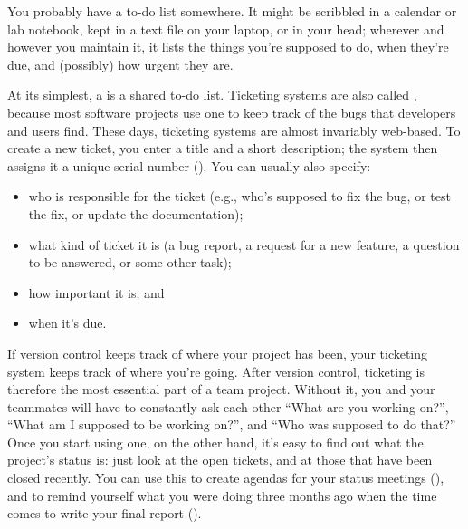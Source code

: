 \documentclass{report}
\begin{document}
You probably have a to-do list somewhere.  It might be scribbled in a
calendar or lab notebook, kept in a text file on your laptop, or in
your head; wherever and however you maintain it, it lists the things
you're supposed to do, when they're due, and (possibly) how urgent
they are.

At its simplest, a  is a shared to-do list.
Ticketing systems are also called , because most
software projects use one to keep track of the bugs that developers
and users find.  These days, ticketing systems are almost invariably
web-based.  To create a new ticket, you enter a title and a short
description; the system then assigns it a unique serial number
().  You can usually also specify:

\begin{itemize}

  \item who is responsible for the ticket (e.g., who's supposed to fix
  the bug, or test the fix, or update the documentation);

  \item what kind of ticket it is (a bug report, a request for a new
  feature, a question to be answered, or some other task);

  \item how important it is; and

  \item when it's due.

\end{itemize}

\begin{figure}
\end{figure}

If version control keeps track of where your project has been, your
ticketing system keeps track of where you're going.  After version
control, ticketing is therefore the most essential part of a team
project.  Without it, you and your teammates will have to constantly
ask each other ``What are you working on?'', ``What am I supposed to
be working on?'', and ``Who was supposed to do that?''  Once you start
using one, on the other hand, it's easy to find out what the project's
status is: just look at the open tickets, and at those that have been
closed recently.  You can use this to create agendas for your status
meetings (), and to remind yourself what
you were doing three months ago when the time comes to write your
final report ().
\end{document}
